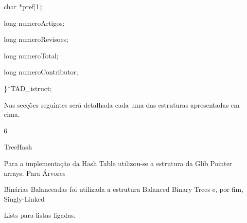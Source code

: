 \documentclass[a4paper,portrait,12pt]{article}
\begin{document}
\begin{flushleft}
char *pref[1];
\end{flushleft}


\begin{flushleft}
long numeroArtigos;
\end{flushleft}


\begin{flushleft}
long numeroRevisoes;
\end{flushleft}


\begin{flushleft}
long numeroTotal;
\end{flushleft}


\begin{flushleft}
long numeroContributor;
\end{flushleft}


\begin{flushleft}
\}*TAD\_istruct;
\end{flushleft}





\begin{flushleft}
Nas secções seguintes será detalhada cada uma das estruturas apresentadas em cima.
\end{flushleft}





6










\begin{flushleft}
TreeHash
\end{flushleft}





\begin{flushleft}
Para a implementação da Hash Table utilizou-se a estrutura da Glib Pointer arrays. Para Árvores
\end{flushleft}


\begin{flushleft}
Binárias Balanceadas foi utilizada a estrutura Balanced Binary Trees e, por fim, Singly-Linked
\end{flushleft}


\begin{flushleft}
Lists para listas ligadas.
\end{flushleft}
\end{document}
